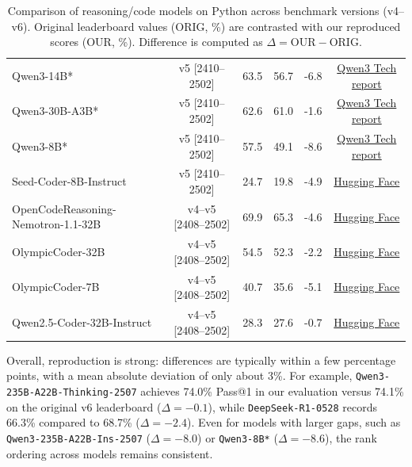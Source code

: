 \documentclass{llmxive}
\begin{document}
\begin{table}[hbt]
{\begin{tabular}{lccccc}
Qwen3-14B* & v5 [2410--2502] & 63.5 & 56.7 & -6.8 & \href{https://arxiv.org/pdf/2505.09388}{Qwen3 Tech report}  \\


\rowcolor{gray!10}
Qwen3-30B-A3B* & v5 [2410--2502] & 62.6 & 61.0 & -1.6 & \href{https://arxiv.org/pdf/2505.09388}{Qwen3 Tech report} \\

Qwen3-8B* & v5 [2410--2502] & 57.5 & 49.1 & -8.6 & \href{https://arxiv.org/pdf/2505.09388}{Qwen3 Tech report}\\
\rowcolor{gray!10}
Seed-Coder-8B-Instruct & v5 [2410--2502] & 24.7 & 19.8 & -4.9 & \href{https://huggingface.co/ByteDance-Seed/Seed-Coder-8B-Instruct}{Hugging Face} \\
\midrule
\rowcolor{gray!10}
OpenCodeReasoning-Nemotron-1.1-32B & v4--v5 [2408--2502] & 69.9 & 65.3 & -4.6 & \href{https://huggingface.co/nvidia/OpenCodeReasoning-Nemotron-1.1-32B}{Hugging Face}\\

OlympicCoder-32B & v4--v5 [2408--2502] & 54.5 & 52.3 & -2.2 & \href{https://huggingface.co/open-r1/OlympicCoder-32B}{Hugging Face} \\

\rowcolor{gray!10}
OlympicCoder-7B & v4--v5 [2408--2502] & 40.7 & 35.6 & -5.1 & \href{https://huggingface.co/open-r1/OlympicCoder-32B}{Hugging Face} \\

Qwen2.5-Coder-32B-Instruct & v4--v5 [2408--2502] & 28.3 & 27.6 & -0.7  & \href{https://huggingface.co/open-r1/OlympicCoder-32B}{Hugging Face} \\

\bottomrule
\end{tabular}
}
\caption{Comparison of reasoning/code models on Python across benchmark versions (v4--v6). 
Original leaderboard values (ORIG, \%) are contrasted with our reproduced scores (OUR, \%). 
Difference is computed as $\Delta = \text{OUR} - \text{ORIG}$.}
\label{tab:model-comparison}
\end{table}


Overall, reproduction is strong: differences are typically within a few percentage points, with a mean absolute deviation of only about 3\%.  
For example, \texttt{Qwen3-235B-A22B-Thinking-2507} achieves 74.0\% Pass@1 in our evaluation versus 74.1\% on the original v6 leaderboard ($\Delta=-0.1$), while \texttt{DeepSeek-R1-0528} records 66.3\% compared to 68.7\% ($\Delta=-2.4$).  
Even for models with larger gaps, such as \texttt{Qwen3-235B-A22B-Ins-2507} ($\Delta=-8.0$) or \texttt{Qwen3-8B*} ($\Delta=-8.6$), the rank ordering across models remains consistent.
\end{document}
